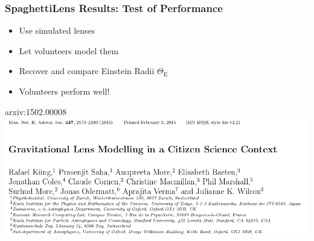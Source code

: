 \documentclass{beamer}
\begin{document}
 \begin{frame}
   \frametitle{SpaghettiLens Results: Test of Performance}
   \begin{itemize}
     \item Use simulated lenses
     \item Let volunteers model them
     \item Recover and compare Einstein Radii $\Theta_\text{E}$
     \item Volunteers perform well!
   \end{itemize}

   \begin{block}{arxiv:1502.00008}
     \includegraphics[width=\textwidth]{imgs/paper_sl1}
   \end{block}

 \end{frame}
\end{document}
